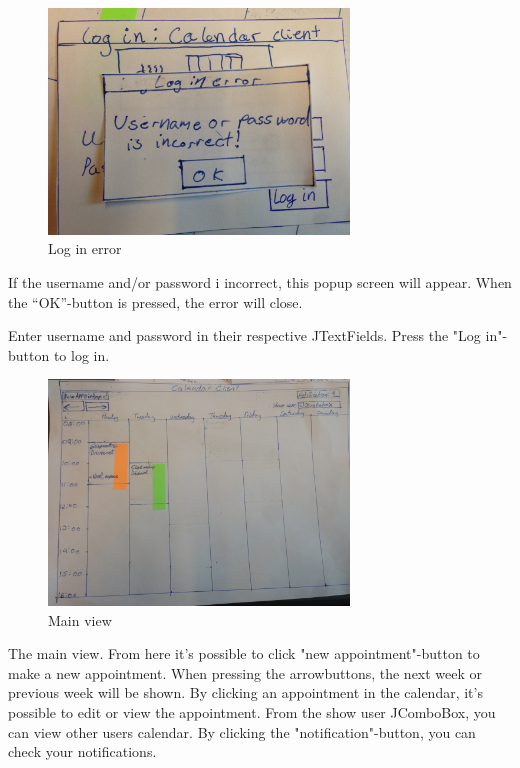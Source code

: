 \documentclass{article}
\begin{document}
\begin{figure}[h!] 
    \begin{center} 
        \includegraphics[width=8cm]{img/IMG_5612.JPG}
        \caption{Log in error}
    \label{loginerror}
    \end{center}
\end{figure}
If the username and/or password i incorrect, this popup screen will appear. When the ``OK''-button is pressed, the error will close.

\newpage

Enter username and password in their respective JTextFields. Press the "Log in"-button to log in.

\newpage

\begin{figure}[h!] 
    \begin{center} 
        \includegraphics[width=8cm]{img/IMG_5601.JPG}
        \caption{Main view}
    \label{mainview}
    \end{center}
\end{figure}

The main view. From here it's possible to click "new appointment"-button to make a new appointment. When pressing the arrowbuttons, the next week or previous week will be shown. By clicking an appointment in the calendar, it's possible to edit or view the appointment. From the show user JComboBox, you can view other users calendar. By clicking the "notification"-button, you can check your notifications.
\end{document}
